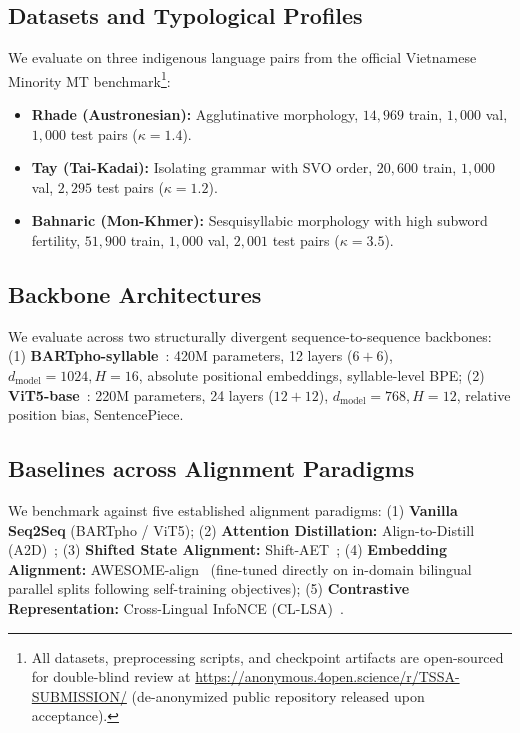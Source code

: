 \documentclass[11pt]{article}
\begin{document}
\subsection{Datasets and Typological Profiles}
We evaluate on three indigenous language pairs from the official Vietnamese Minority MT benchmark\footnote{All datasets, preprocessing scripts, and checkpoint artifacts are open-sourced for double-blind review at \url{https://anonymous.4open.science/r/TSSA-SUBMISSION/} (de-anonymized public repository released upon acceptance).}:
\begin{itemize}[leftmargin=*]
    \item \textbf{Rhade (Austronesian):} Agglutinative morphology, $14,969$ train, $1,000$ val, $1,000$ test pairs ($\kappa = 1.4$).
    \item \textbf{Tay (Tai-Kadai):} Isolating grammar with SVO order, $20,600$ train, $1,000$ val, $2,295$ test pairs ($\kappa = 1.2$).
    \item \textbf{Bahnaric (Mon-Khmer):} Sesquisyllabic morphology with high subword fertility, $51,900$ train, $1,000$ val, $2,001$ test pairs ($\kappa = 3.5$).
\end{itemize}

\subsection{Backbone Architectures}
We evaluate across two structurally divergent sequence-to-sequence backbones:
(1) \textbf{BARTpho-syllable}~\cite{tran2021bartpho}: 420M parameters, 12 layers ($6+6$), $d_{\text{model}} = 1024, H = 16$, absolute positional embeddings, syllable-level BPE;
(2) \textbf{ViT5-base}~\cite{phan2022vit5}: 220M parameters, 24 layers ($12+12$), $d_{\text{model}} = 768, H = 12$, relative position bias, SentencePiece.

\subsection{Baselines across Alignment Paradigms}
We benchmark against five established alignment paradigms:
(1) \textbf{Vanilla Seq2Seq} (BARTpho / ViT5);
(2) \textbf{Attention Distillation:} Align-to-Distill (A2D)~\cite{jin2024align};
(3) \textbf{Shifted State Alignment:} Shift-AET~\cite{chen2020accurate};
(4) \textbf{Embedding Alignment:} AWESOME-align~\cite{dou2021word} (fine-tuned directly on in-domain bilingual parallel splits following self-training objectives);
(5) \textbf{Contrastive Representation:} Cross-Lingual InfoNCE (CL-LSA)~\cite{chi2021infoxlm}.
\end{document}
